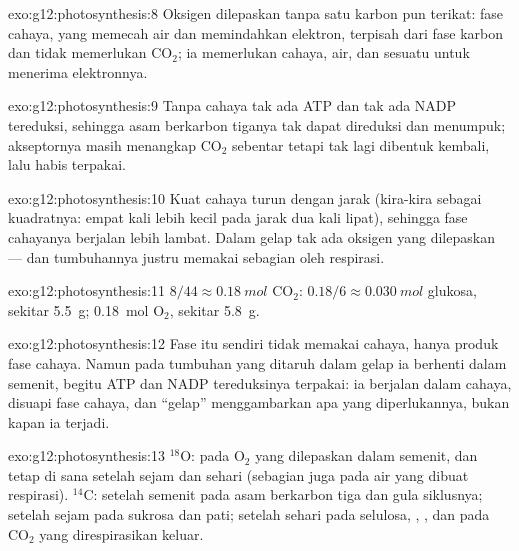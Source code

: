 \begin{solution}{exo:g12:photosynthesis:8}
Oksigen dilepaskan tanpa satu karbon pun terikat: fase cahaya, yang
memecah air dan memindahkan elektron, terpisah dari fase karbon dan
tidak memerlukan $\mathrm{CO_2}$; ia memerlukan cahaya, air, dan
sesuatu untuk menerima elektronnya.
\end{solution}

\begin{solution}{exo:g12:photosynthesis:9}
Tanpa cahaya tak ada ATP dan tak ada NADP tereduksi, sehingga asam
berkarbon tiganya tak dapat direduksi dan menumpuk; akseptornya masih
menangkap $\mathrm{CO_2}$ sebentar tetapi tak lagi dibentuk kembali,
lalu habis terpakai.
\end{solution}

\begin{solution}{exo:g12:photosynthesis:10}
Kuat cahaya turun dengan jarak (kira-kira sebagai kuadratnya: empat
kali lebih kecil pada jarak dua kali lipat), sehingga fase cahayanya
berjalan lebih lambat. Dalam gelap tak ada oksigen yang dilepaskan ---
dan tumbuhannya justru memakai sebagian oleh respirasi.
\end{solution}

\begin{solution}{exo:g12:photosynthesis:11}
$8/44 \approx \qty{0.18}{mol}$ $\mathrm{CO_2}$: $0.18/6 \approx
\qty{0.030}{mol}$ glukosa, sekitar \qty{5.5}{g}; \qty{0.18}{mol}
$\mathrm{O_2}$, sekitar \qty{5.8}{g}.
\end{solution}

\begin{solution}{exo:g12:photosynthesis:12}
Fase itu sendiri tidak memakai cahaya, hanya produk fase cahaya.
Namun pada tumbuhan yang ditaruh dalam gelap ia berhenti dalam
semenit, begitu ATP dan NADP tereduksinya terpakai: ia berjalan dalam
cahaya, disuapi fase cahaya, dan ``gelap'' menggambarkan apa yang
diperlukannya, bukan kapan ia terjadi.
\end{solution}

\begin{solution}{exo:g12:photosynthesis:13}
$^{18}$O: pada $\mathrm{O_2}$ yang dilepaskan dalam semenit, dan tetap
di sana setelah sejam dan sehari (sebagian juga pada air yang dibuat
respirasi). $^{14}$C: setelah semenit pada asam berkarbon tiga dan
gula siklusnya; setelah sejam pada sukrosa dan pati; setelah sehari
pada selulosa, , , dan pada $\mathrm{CO_2}$ yang
direspirasikan keluar.
\end{solution}

